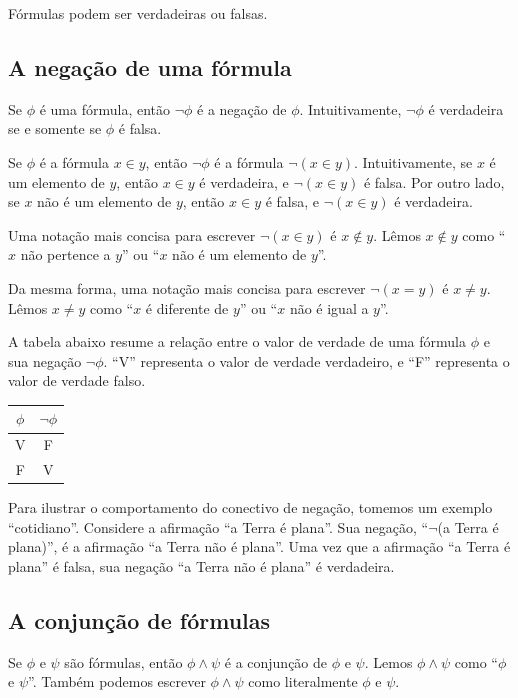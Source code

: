 Fórmulas podem ser verdadeiras ou falsas.

\subsection{A negação de uma fórmula}
Se $\phi$ é uma fórmula, então $\neg \phi$ é a negação de $\phi$.
Intuitivamente, $\neg \phi$ é verdadeira se e somente se $\phi$ é falsa.

Se $\phi$ é a fórmula $x\in y$, então $\neg \phi$ é a fórmula $\neg(x\in y)$.
Intuitivamente, se $x$ é um elemento de $y$, então $x\in y$ é verdadeira, e $\neg(x\in y)$ é falsa.
Por outro lado, se $x$ não é um elemento de $y$, então $x\in y$ é falsa, e $\neg(x\in y)$ é verdadeira.

Uma notação mais concisa para escrever $\neg(x\in y)$ é $x\notin y$.
Lêmos $x\notin y$ como ``$x$ não pertence a $y$'' ou ``$x$ não é um elemento de $y$''.

Da mesma forma, uma notação mais concisa para escrever $\neg(x=y)$ é $x\neq y$.
Lêmos $x\neq y$ como ``$x$ é diferente de $y$'' ou ``$x$ não é igual a $y$''.

A tabela abaixo resume a relação entre o valor de verdade de uma fórmula $\phi$ e sua negação $\neg \phi$.
``V'' representa o valor de verdade verdadeiro, e ``F'' representa o valor de verdade falso.

\begin{center}
    \begin{tabular}{c|c}
        $\phi$ & $\neg \phi$ \\
        \hline
        V & F \\
        F & V
    \end{tabular}
\end{center}

\begin{example}
    Para ilustrar o comportamento do conectivo de negação, tomemos um exemplo ``cotidiano''.
    Considere a afirmação ``a Terra é plana''.
    Sua negação, ``$\neg$(a Terra é plana)'', é a afirmação ``a Terra não é plana''.
    Uma vez que a afirmação ``a Terra é plana'' é falsa, sua negação ``a Terra não é plana'' é verdadeira.
\end{example}

\subsection{A conjunção de fórmulas}
Se $\phi$ e $\psi$ são fórmulas, então $\phi\wedge \psi$ é a conjunção de $\phi$ e $\psi$.
Lemos $\phi\wedge \psi$ como ``$\phi$ e $\psi$''.
Também podemos escrever $\phi\wedge \psi$ como literalmente $\phi$ e $\psi$.

